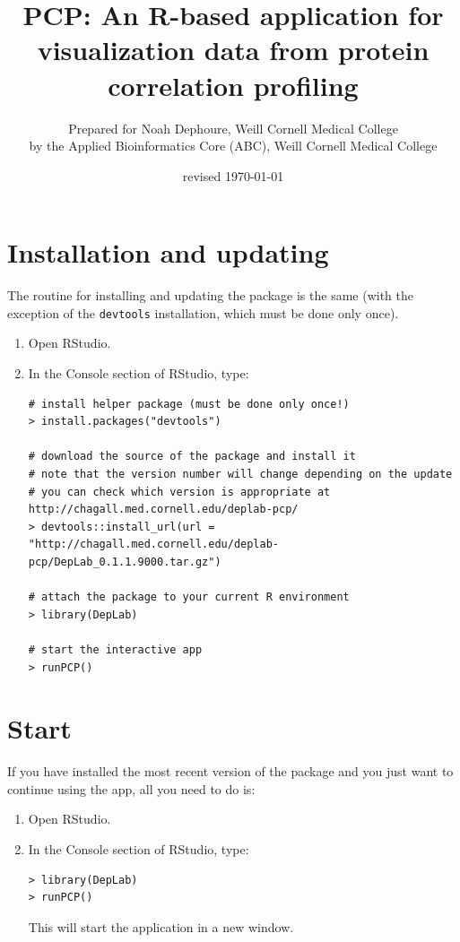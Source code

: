 \documentclass[letterpaper, twocolumn, 9pt]{article}
\title{PCP: An R-based application for visualization data from protein correlation profiling}
\date{revised \today}
\author{Prepared for Noah Dephoure, Weill Cornell Medical College\\ 
by the Applied Bioinformatics Core (ABC), Weill Cornell Medical College}
\begin{document}
\onecolumn
\frenchspacing 
\maketitle

\tableofcontents
\clearpage

\twocolumn
\section{Installation and updating}

The routine for installing and updating the package is the same (with the exception of the \texttt{devtools} installation, which must be done only once).

\begin{enumerate}
\item Open RStudio.
\item{ In the \textsf{Console} section of RStudio, type:
\begin{lstlisting}
# install helper package (must be done only once!)
> install.packages("devtools")

# download the source of the package and install it
# note that the version number will change depending on the update
# you can check which version is appropriate at http://chagall.med.cornell.edu/deplab-pcp/
> devtools::install_url(url = "http://chagall.med.cornell.edu/deplab-pcp/DepLab_0.1.1.9000.tar.gz")

# attach the package to your current R environment
> library(DepLab)

# start the interactive app
> runPCP()
\end{lstlisting}}
\end{enumerate}


\section{Start}

If you have installed the most recent version of the package and you just want to continue using the app, all you need to do is:

\begin{enumerate}
\item Open RStudio.
\item{ In the \textsf{Console} section of RStudio, type:
\begin{lstlisting}
> library(DepLab)
> runPCP()
\end{lstlisting}

This will start the application in a new window.}
\end{enumerate}
\end{document}
